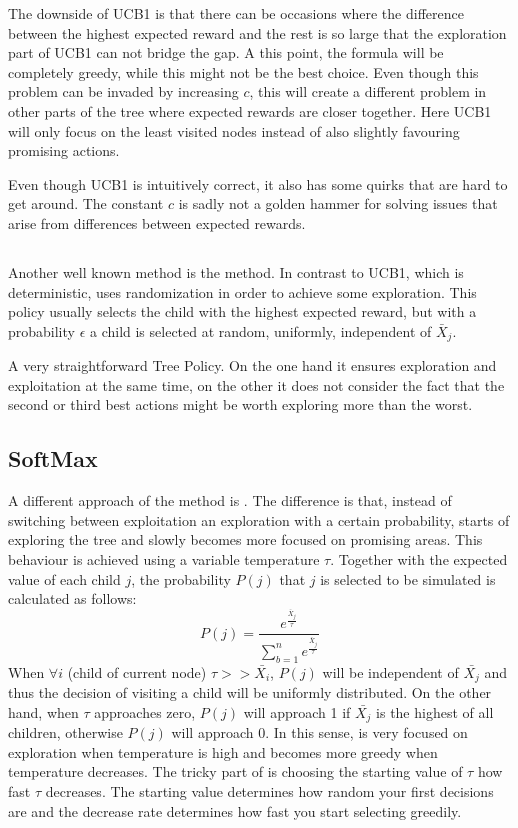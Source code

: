The downside of UCB1 is that there can be occasions where the difference between the highest expected reward and the rest is so large that the exploration part of UCB1 can not bridge the gap. A this point, the formula will be completely greedy, while this might not be the best choice. Even though this problem can be invaded by increasing $c$, this will create a different problem in other parts of the tree where expected rewards are closer together. Here UCB1 will only focus on the least visited nodes instead of also slightly favouring promising actions.

Even though UCB1 is intuitively correct, it also has some quirks that are hard to get around. The constant $c$ is sadly not a golden hammer for solving issues that arise from differences between expected rewards. 

\subsection{\textbf{\egreedy}}

Another well known method is the \egreedy method\cite{barto1998reinforcement}. In contrast to UCB1, which is deterministic, \egreedy uses randomization in order to achieve some exploration. This policy usually selects the child with the highest expected reward, but with a probability $\epsilon$ a child is selected at random, uniformly, independent of $\bar{X}_j$.

A very straightforward Tree Policy. On the one hand it ensures exploration and exploitation at the same time, on the other it does not consider the fact that the second or third best actions might be worth exploring more than the worst. 

\subsection{SoftMax}
A different approach of the \egreedy method is \soft\cite{barto1998reinforcement}. The difference is that, instead of switching between exploitation an exploration with a certain probability, \soft starts of exploring the tree and slowly becomes more focused on promising areas. This behaviour is achieved using a variable temperature $\tau$. Together with the expected value of each child $j$, the probability $P(j)$ that $j$ is selected to be simulated is calculated as follows:  
\begin{equation}
P(j) = \frac{e^\frac{\bar{X}_j}{\tau}}{\sum_{b=1}^{n} e^\frac{\bar{X}_j}{\tau}}
\end{equation}
When $\forall i$ (child of current node) $\tau >> \bar{X_i}$, $P(j)$ will be independent of $\bar{X_j}$ and thus the decision of visiting a child will be uniformly distributed. On the other hand, when $\tau$ approaches zero, $P(j)$ will approach 1 if $\bar{X_j}$ is the highest of all children, otherwise $P(j)$ will approach 0. In this sense, \soft is very focused on exploration when temperature is high and becomes more greedy when temperature decreases. The tricky part of \soft is choosing the starting value of $\tau$ how fast $\tau$ decreases. The starting value determines how random your first decisions are and the decrease rate determines how fast you start selecting greedily. 

